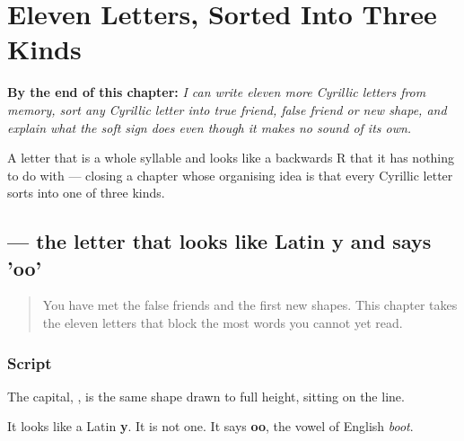 
\chapter{Eleven Letters, Sorted Into Three Kinds}
\label{ch:ru-script-eleven}

\begin{chapteropening}
\textbf{By the end of this chapter:} \emph{I can write eleven more Cyrillic letters from memory, sort any Cyrillic letter into true friend, false friend or new shape, and explain what the soft sign does even though it makes no sound of its own.}

A letter that is a whole syllable and looks like a backwards R that it has nothing to do with — closing a chapter whose organising idea is that every Cyrillic letter sorts into one of three kinds.
\end{chapteropening}

\section[\texorpdfstring{\ru{у} (u)}{у (u)}]{ — the letter that looks like Latin y and says 'oo'}

\label{lesson:RU-W06-u}



\begin{quote}
You have met the false friends and the first new shapes. This chapter takes the eleven letters that block the most words you cannot yet read.
\end{quote}

\subsection*{Script}

\begin{quote}
   
\end{quote}

The capital, \textbf{}, is the same shape drawn to full height, sitting on the line.

It looks like a Latin \textbf{y}. It is not one. It says \textbf{oo}, the vowel of English \emph{boot}.


